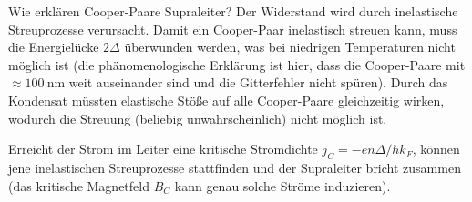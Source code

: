 \begin{fquestion}{Wie erklären Cooper-Paare Supraleiter?}
    Der Widerstand wird durch inelastische Streuprozesse verursacht.
    Damit ein Cooper-Paar inelastisch streuen kann, muss die Energielücke $2\Delta$ überwunden werden, was bei niedrigen Temperaturen nicht möglich ist (die phänomenologische Erklärung ist hier, dass die Cooper-Paare mit $\approx \SI{100}{\nano\metre}$ weit auseinander sind und die Gitterfehler nicht spüren).
    Durch das Kondensat müssten elastische Stöße auf alle Cooper-Paare gleichzeitig wirken, wodurch die Streuung (beliebig unwahrscheinlich) nicht möglich ist.
    
    Erreicht der Strom im Leiter eine kritische Stromdichte $j_C = -e n \Delta / \hbar k_F$, können jene inelastischen Streuprozesse stattfinden und der Supraleiter bricht zusammen (das kritische Magnetfeld $B_C$ kann genau solche Ströme induzieren). 
\end{fquestion}


